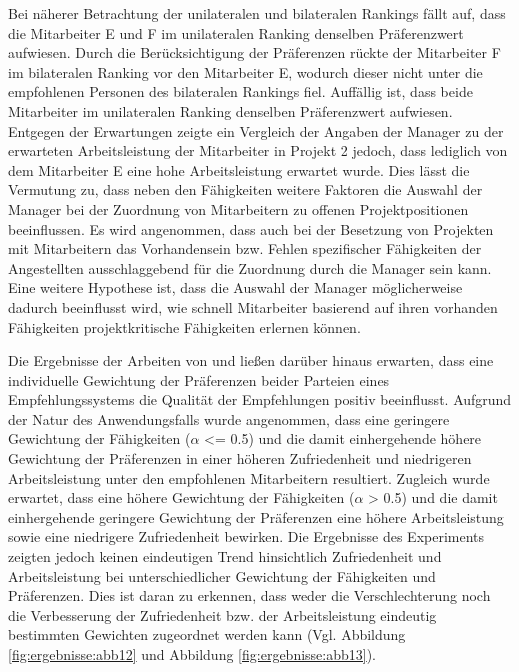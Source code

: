 Bei näherer Betrachtung der unilateralen und bilateralen Rankings fällt auf, dass die Mitarbeiter E und F im unilateralen Ranking denselben Präferenzwert aufwiesen.
Durch die Berücksichtigung der Präferenzen rückte der Mitarbeiter F im bilateralen Ranking vor den Mitarbeiter E, wodurch dieser nicht unter die empfohlenen Personen des bilateralen Rankings fiel.
Auffällig ist, dass beide Mitarbeiter im unilateralen Ranking denselben Präferenzwert aufwiesen.
Entgegen der Erwartungen zeigte ein Vergleich der Angaben der Manager zu der erwarteten Arbeitsleistung der Mitarbeiter in Projekt 2 jedoch, dass lediglich von dem Mitarbeiter E eine hohe Arbeitsleistung erwartet wurde.
Dies lässt die Vermutung zu, dass neben den Fähigkeiten weitere Faktoren die Auswahl der Manager bei der Zuordnung von Mitarbeitern zu offenen Projektpositionen beeinflussen.
Es wird angenommen, dass auch bei der Besetzung von Projekten mit Mitarbeitern das Vorhandensein bzw. Fehlen spezifischer Fähigkeiten der Angestellten ausschlaggebend für die Zuordnung durch die Manager sein kann.  
Eine weitere Hypothese ist, dass die Auswahl der Manager möglicherweise dadurch beeinflusst wird, wie schnell Mitarbeiter basierend auf ihren vorhanden Fähigkeiten projektkritische Fähigkeiten erlernen können.

Die Ergebnisse der Arbeiten von \textcite[S. 131ff.]{kleinerman:2:inproceedings} und \textcite[S. 4031 ff.]{neve:inproceedings} ließen darüber hinaus erwarten, dass eine individuelle Gewichtung der Präferenzen beider Parteien eines Empfehlungssystems die Qualität der Empfehlungen positiv beeinflusst.
Aufgrund der Natur des Anwendungsfalls wurde angenommen, dass eine geringere Gewichtung der Fähigkeiten ($\alpha$ <= 0.5) und die damit einhergehende höhere Gewichtung der Präferenzen in einer höheren Zufriedenheit und niedrigeren Arbeitsleistung unter den empfohlenen Mitarbeitern resultiert.
Zugleich wurde erwartet, dass eine höhere Gewichtung der Fähigkeiten ($\alpha$ > 0.5) und die damit einhergehende geringere Gewichtung der Präferenzen eine höhere Arbeitsleistung sowie eine niedrigere Zufriedenheit bewirken.
Die Ergebnisse des Experiments zeigten jedoch keinen eindeutigen Trend hinsichtlich Zufriedenheit und Arbeitsleistung bei unterschiedlicher Gewichtung der Fähigkeiten und Präferenzen.
Dies ist daran zu erkennen, dass weder die Verschlechterung noch die Verbesserung der Zufriedenheit bzw. der Arbeitsleistung eindeutig bestimmten Gewichten zugeordnet werden kann (Vgl. Abbildung \ref{fig:ergebnisse:abb12} und Abbildung \ref{fig:ergebnisse:abb13}).

